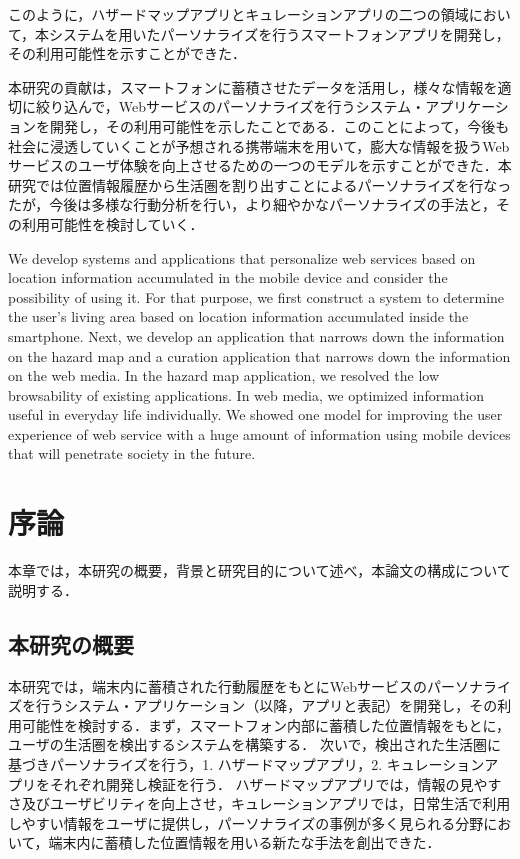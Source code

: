 \documentclass[a4paper]{jsarticle}
\begin{document}
このように，ハザードマップアプリとキュレーションアプリの二つの領域において，本システムを用いたパーソナライズを行うスマートフォンアプリを開発し，その利用可能性を示すことができた．

本研究の貢献は，スマートフォンに蓄積させたデータを活用し，様々な情報を適切に絞り込んで，Webサービスのパーソナライズを行うシステム・アプリケーションを開発し，その利用可能性を示したことである．このことによって，今後も社会に浸透していくことが予想される携帯端末を用いて，膨大な情報を扱うWebサービスのユーザ体験を向上させるための一つのモデルを示すことができた．本研究では位置情報履歴から生活圏を割り出すことによるパーソナライズを行なったが，今後は多様な行動分析を行い，より細やかなパーソナライズの手法と，その利用可能性を検討していく．

We develop systems and applications that personalize web services based on location information accumulated in the mobile device and consider the possibility of using it. For that purpose, we first construct a system to determine the user's living area based on location information accumulated inside the smartphone. Next, we develop an application that narrows down the information on the hazard map and a curation application that narrows down the information on the web media. In the hazard map application, we resolved the low browsability of existing applications. In web media, we optimized information useful in everyday life individually. We showed one model for improving the user experience of web service with a huge amount of information using mobile devices that will penetrate society in the future.
\makemokuji

\newpage

\setcounter{page}{1} %
\section{序論}
本章では，本研究の概要，背景と研究目的について述べ，本論文の構成について説明する．

\subsection{本研究の概要}
本研究では，端末内に蓄積された行動履歴をもとにWebサービスのパーソナライズを行うシステム・アプリケーション（以降，アプリと表記）を開発し，その利用可能性を検討する．まず，スマートフォン内部に蓄積した位置情報をもとに，ユーザの生活圏を検出するシステムを構築する．
次いで，検出された生活圏に基づきパーソナライズを行う，1. ハザードマップアプリ，2. キュレーションアプリをそれぞれ開発し検証を行う．
ハザードマップアプリでは，情報の見やすさ及びユーザビリティを向上させ，キュレーションアプリでは，日常生活で利用しやすい情報をユーザに提供し，パーソナライズの事例が多く見られる分野において，端末内に蓄積した位置情報を用いる新たな手法を創出できた．
\end{document}
